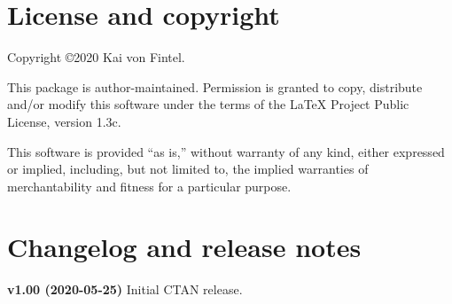 \documentclass[
]{article}
\begin{document}
\hypertarget{license-and-copyright}{%
\section{License and copyright}\label{license-and-copyright}}

Copyright ©2020 Kai von Fintel.

This package is author-maintained. Permission is granted to copy,
distribute and/or modify this software under the terms of the LaTeX
Project Public License, version 1.3c.

This software is provided ``as is,'' without warranty of any kind,
either expressed or implied, including, but not limited to, the implied
warranties of merchantability and fitness for a particular purpose.

\hypertarget{changelog-and-release-notes}{%
\section{Changelog and release
notes}\label{changelog-and-release-notes}}

\textbf{v1.00 (2020-05-25)} Initial CTAN release.
\end{document}
